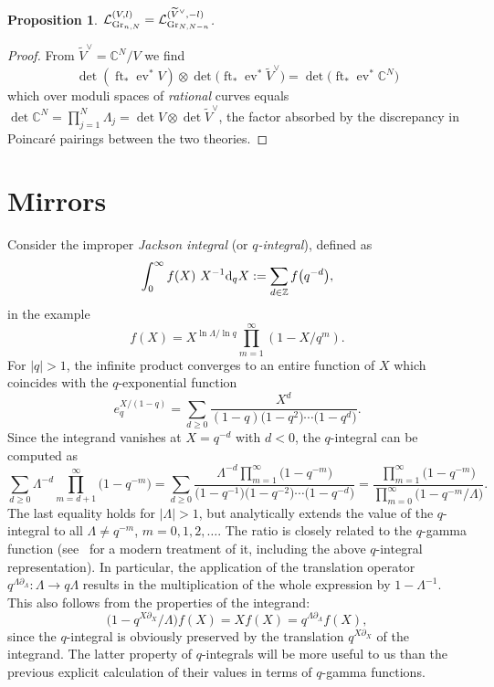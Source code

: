 \documentclass[10pt,a4paper]{amsart}
\numberwithin{equation}{section}
\newtheorem{Proposition}[Theorem]{Proposition}
{ \theoremstyle{definition}
\newtheorem{Definition}[Theorem]{Definition}
\newtheorem{Example}[Theorem]{Example}
\newtheorem{Remark}[Theorem]{Remark} }
\def\L{\mathcal L}
\def\ZZ{\mathbb Z}
\def\CC{\mathbb C}
\def\det{\operatorname{det}}
\def\tilde{\widetilde}
\def\p{\partial}
\def\ev{\operatorname{ev}}
\def\ft{\operatorname{ft}}
\theoremstyle{definition}
\theoremstyle{plain}
\begin{document}
\begin{Proposition}$\L_{{\rm Gr}_{n,N}}^{(V,l)}=\L_{{\rm Gr}_{N,N-n}}^{(\tilde{V}^{\vee},-l)}$.
\end{Proposition}

\begin{proof}
From $\tilde{V}^{\vee}=\CC^N/V$ we find
\[
\det (\ft_*\ev^*V) \otimes \det \big(\ft_*\ev^*\tilde{V}^{\vee}\big) = \det \big(\ft_*\ev^*\CC^N\big)
\]
which over moduli spaces of {\em rational} curves equals $\det \CC^N =\prod_{j=1}^N\Lambda_j=\det V \otimes \det \tilde{V}^{\vee}$,
the factor absorbed by the discrepancy in Poincar\'e pairings between the two theories.
\end{proof}


\section{Mirrors}
\label{Sec8}

Consider the improper {\em Jackson integral} (or {\em $q$-integral}), defined as
\[
\int_0^{\infty} f(X)\ X^{-1}{\rm d}_qX :=\sum_{d\in \ZZ} f\big(q^{-d}\big),
\]
in the example
\[
f(X)=X^{\ln \Lambda/\ln q} \prod_{m=1}^{\infty}(1-X/q^m).
\]
For $|q|>1$, the infinite product converges to an entire function of $X$
which coincides with the $q$-exponential function
\[ e_q^{X/(1-q)}=\sum_{d\geq 0}\frac{X^d}{(1-q)\big(1-q^2\big)\cdots\big(1-q^d\big)}.\]
Since the integrand vanishes at $X=q^{-d}$ with $d<0$, the $q$-integral can be computed as
\[
\sum_{d\geq 0}\Lambda^{-d}\prod_{m=d+1}^{\infty}\big(1-q^{-m}\big)=\sum_{d\geq 0}\frac{\Lambda^{-d}\prod_{m=1}^{\infty}\big(1-q^{-m}\big)}{\big(1-q^{-1}\big)\big(1-q^{-2}\big)\cdots \big(1-q^{-d}\big)} =
\frac{\prod_{m=1}^{\infty}\big(1-q^{-m}\big)}{\prod_{m=0}^{\infty}\big(1-q^{-m}/\Lambda\big)}.
\]
The last equality holds for $|\Lambda|>1$, but analytically
extends the value of the $q$-integral to all $\Lambda\neq q^{-m}$, $m=0,1,2,\dots$.
The ratio is closely related to the $q$-gamma function (see~\cite{DK} for a modern treatment of it, including the above $q$-integral representation). In particular, the application of the translation operator $q^{\Lambda\p_{\Lambda}}\colon \Lambda \to q\Lambda$ results in the multiplication of the whole expression by $1-\Lambda^{-1}$. This also follows from the properties of the integrand:
\[
\big(1-q^{X\p_X}/\Lambda\big) f(X) = X f(X) = q^{\Lambda\p_{\Lambda}} f(X),
\]
since the $q$-integral is obviously preserved by the translation $q^{X\p_X}$ of the integrand. The latter property of $q$-integrals will be more useful to us than the previous explicit calculation of their values in terms of $q$-gamma functions.
\end{document}
